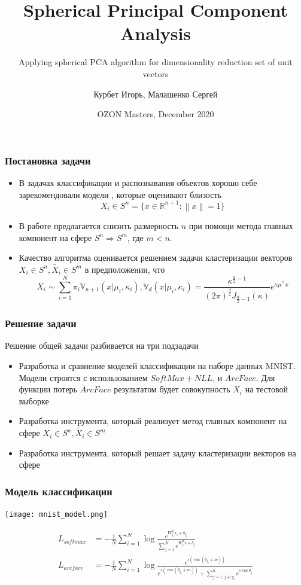 \documentclass{beamer}
\title[Spherical Principal Component Analysis]{Spherical Principal Component Analysis}
\subtitle{Applying spherical PCA algorithm for dimensionality reduction set of unit vectors}
\author[] { Курбет Игорь, Малашенко Сергей }
\date[]{OZON Masters, December 2020}
\begin{document}
\frame{\titlepage}

\begin{frame}
\frametitle{Постановка задачи}
\begin{itemize}
 \item В задачах классификации и распознавания объектов хорошо себе зарекомендовали модели \cite{deng2019arcface}, которые оценивают близость 
 $$X_i \in S^n = \{ x \in \mathbb{R}^{n+1} : \left\lVert x \right\rVert=1 \}$$
 \item В работе предлагается снизить размерность $n$ при помощи метода главных компонент на сфере $S^n \Rightarrow S^m$, где $m < n$.
 \item Качество алгоритма оценивается решением задачи кластеризации векторов $X_i \in S^n, \tilde{X_i} \in S^m$ \cite{4e952c207c0444a9a0083fa9cf4e3cde} в предположении, что $$X_i \sim \sum_{i=1}^{N}\pi_i \mathbb{V}_{n+1}(x | \mu_i, \kappa_i), \mathbb{V}_d(x | \mu_i, \kappa_i)=\frac{\kappa^{\frac{d}{2}-1}}{(2\pi)^{\frac{d}{2}}J_{\frac{d}{2}-1}(\kappa)} e^{\kappa \mu^{\top} x}$$
\end{itemize}
\end{frame}

\begin{frame}
\frametitle{Решение задачи}
Решение общей задачи разбивается на три подзадачи
\begin{itemize}
 \item Разработка и сравнение моделей классификации на наборе данных MNIST. Модели строятся с использованием $SoftMax + NLL$, и $ArcFace$. Для функции потерь $ArcFace$ результатом будет совокупность $X_i$ на тестовой выборке
\item Разработка инструмента, который реализует метод главных компонент на сфере $X_i \in S^n, \tilde{X_i} \in S^m$
\item Разработка инструмента, который решает задачу кластеризации векторов на сфере
\end{itemize}

\end{frame}

\begin{frame}
\frametitle{Модель классификации}
\begin{center}
\texttt{[image: mnist\_model.png]}
\end{center}
\begin{align*}
L_{softmax} &= -\frac{1}{N}\sum^{N}_{i=1}\log\frac{e^{W^{T}_{y_{i}}x_{i} + b_{y_{j}} }}{\sum^{N}_{j=1}e^{W^{T}_{j}x + b_j }} \\
L_{arcface} &= -\frac{1}{N}\sum^{N}_{i=1}\log\frac{e^{s\left(\cos\left(\theta_{y_{i}} + m\right)\right)}}{e^{s\left(\cos\left(\theta_{y_{i}} + m\right)\right)} + \sum^{n}_{j=1, j \neq y_{i}}e^{s\cos\theta_{j}}}
\end{align*}
\end{frame}
\end{document}
